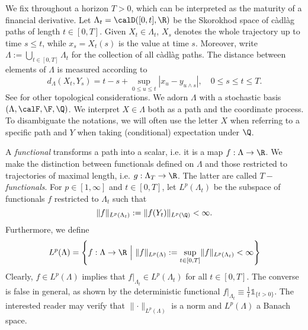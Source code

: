 We fix throughout a horizon $T>0$, which can be interpreted as the maturity of a financial derivative. Let $\Lambda_t = \calD([0,t],\R)$ be the Skorokhod space of c\`adl\`ag paths of length $t\in [0,T]$. 
Given $X_t\in \Lambda_t$, $X_s$ denotes the whole trajectory up to time $s\le t$, while $x_s= X_t(s)$ is the value at time $s$. 
Moreover, write $\Lambda := \bigcup_{t\in[0,T]}\Lambda_t$ for the collection of all c\`adl\`ag paths. The distance between elements of $\Lambda$ is measured according to %
$$d_{\Lambda}( X_t, Y_s) =t-s + \sup_{0 \le u \le t} |x_u - y_{u\wedge s} | , \quad 0 \le s \le t \le T. $$ %
See \cite{Dupire} for other topological considerations. %
We adorn $\Lambda$  %
with a stochastic basis
$(\Lambda,\calF,\F, \Q)$. %
We interpret $X \in \Lambda$ both as a path and the coordinate process. To disambiguate the notations, we will often use the letter $X$ when referring to a  specific path and $Y$ when taking (conditional) expectation under $\Q$. %

A \textit{functional} transforms a path into a scalar, i.e. it is a map $f:\Lambda \to \R$. We make the distinction between functionals defined on $\Lambda$ and those restricted to trajectories of maximal length, i.e. $g:\Lambda_T \to \R$. The latter are called \textit{$T-$functionals}.  
For $p\in [1,\infty]$ and $t\in [0,T]$, 
let $L^p(\Lambda_t)$ be the subspace of functionals $f$ restricted to $\Lambda_t$ such that  
\begin{equation}\label{eq:L(Lambda_t)}
    \lVert f \rVert_{L^p(\Lambda_t)} :=  \lVert f(Y_t) \rVert_{L^p(\Q)} < \infty.
\end{equation}
Furthermore, we define 
\begin{equation}\label{eq:L(Lambda)}
    L^p(\Lambda) = \left \{ f: \Lambda\to \R \ \Big | \ \lVert f \rVert_{L^p(\Lambda)} := \sup_{t \in [0,T]} \lVert f \rVert_{L^p(\Lambda_t)} < \infty \right\}
\end{equation}
 Clearly, $f\in L^p(\Lambda) $ implies that $f|_{\Lambda_t} \in L^p(\Lambda_t)$ for all $ t \in [0,T]$. The converse is  false in general, as shown by the deterministic functional $f|_{\Lambda_t}  \equiv \frac{1}{t}\mathds{1}_{\{t>0\}}$. The interested reader may verify that $\lVert \cdot \rVert_{L^p(\Lambda)}$ is a norm and $L^p(\Lambda)$ a Banach space. %

